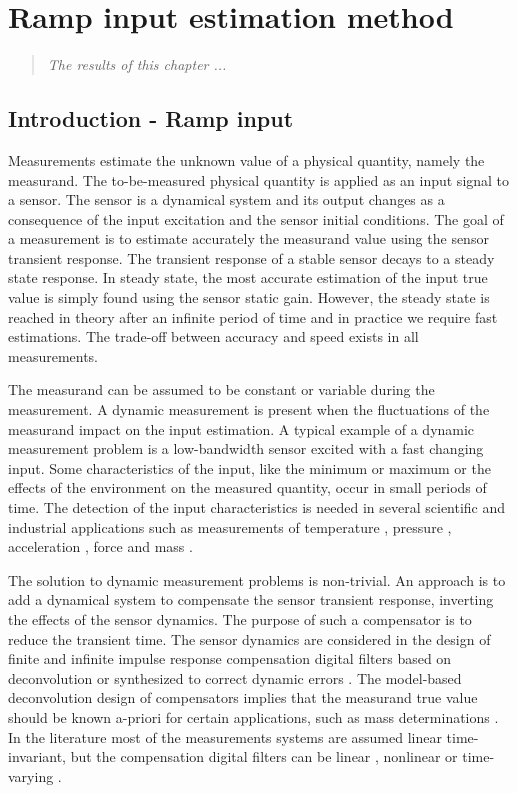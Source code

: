 

\glsresetall

\chapter{Ramp input estimation method}\label{chap:RampInput}

\begin{quote}
\emph{The results of this chapter ...}\vfill{}
\end{quote}


\section{Introduction  - Ramp input}

Measurements estimate the unknown value of a physical quantity, namely the measurand.
The to-be-measured physical quantity is applied as an input signal to a sensor. 
The sensor is a dynamical system and its output changes as a consequence of the input excitation and the sensor initial conditions.
The goal of a measurement is to estimate accurately the measurand value using the sensor transient response.
The transient response of a stable sensor decays to a steady state response.
In steady state, the most accurate estimation of the input true value is simply found using the sensor static gain.
However, the steady state is reached in theory after an infinite period of time and in practice we require fast estimations.
The trade-off between accuracy and speed exists in all measurements.

The measurand can be assumed to be constant or variable during the measurement.
A dynamic measurement is present when the fluctuations of the measurand impact on the input estimation.
A typical example of a dynamic measurement problem is a low-bandwidth sensor excited with a fast changing input.
Some characteristics of the input, like the minimum or maximum or the effects of the environment on the measured quantity, occur in small periods of time.  
The detection of the input characteristics is needed in several scientific and industrial applications such as measurements of temperature \cite{Saggin01}, pressure \cite{Matthews14}, acceleration \cite{Link07}, force \cite{Vlajic16, Hessling08a} and mass \cite{Shu93, Boschetti13}.

The solution to dynamic measurement problems is non-trivial.
An approach is to add a dynamical system to compensate the sensor transient response, inverting the effects of the sensor dynamics.
The purpose of such a compensator is to reduce the transient time.
The sensor dynamics are considered in the design of finite and infinite impulse response compensation digital filters based on deconvolution \cite{Eichstadt10} or synthesized to correct dynamic errors \cite{Hessling08a}. 
The model-based deconvolution design of compensators implies that the measurand true value should be known a-priori for certain applications, such as mass determinations \cite{Boschetti13, Niedzwiecki16b}.
In the literature most of the measurements systems are assumed linear time-invariant, but the compensation digital filters can be linear \cite{Tasaki07},  nonlinear \cite{Shu93} or time-varying \cite{Pietrzak14}.

